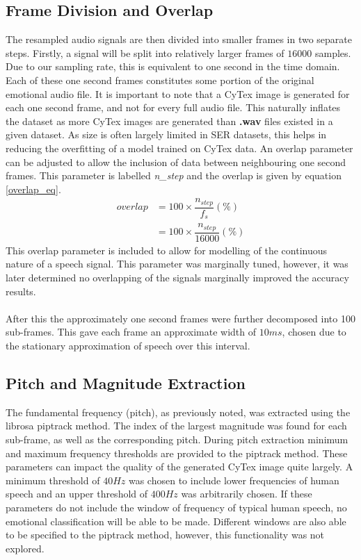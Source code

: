 \subsection{Frame Division and Overlap}
The resampled audio signals are then divided into smaller frames in two separate steps. Firstly, a signal will be split into relatively larger frames of $16000$ samples. Due to our sampling rate, this is equivalent to one second in the time domain. Each of these one second frames constitutes some portion of the original emotional audio file. It is important to note that a CyTex image is generated for each one second frame, and not for every full audio file. This naturally inflates the dataset as more CyTex images are generated than \textbf{.wav} files existed in a given dataset. As size is often largely limited in SER datasets, this helps in reducing the overfitting of a model trained on CyTex data. An overlap parameter can be adjusted to allow the inclusion of data between neighbouring one second frames. This parameter is labelled \textit{n\_step} and the overlap is given by equation \ref{overlap_eq}.
\begin{align} \label{overlap_eq}
    overlap &= 100 \times \dfrac{n_{step}}{f_s} (\%) \\
            &= 100 \times \dfrac{n_{step}}{16000} (\%) \nonumber
\end{align}
This overlap parameter is included to allow for modelling of the continuous nature of a speech signal. This parameter was marginally tuned, however, it was later determined no overlapping of the signals marginally improved the accuracy results.\\ \\
After this the approximately one second frames were further decomposed into 100 sub-frames. This gave each frame an approximate width of $10ms$, chosen due to the stationary approximation of speech over this interval.

\subsection{Pitch and Magnitude Extraction}
The fundamental frequency (pitch), as previously noted, was extracted using the librosa piptrack method. The index of the largest magnitude was found for each sub-frame, as well as the corresponding pitch. During pitch extraction minimum and maximum frequency thresholds are provided to the piptrack method. These parameters can impact the quality of the generated CyTex image quite largely. A minimum threshold of $40Hz$ was chosen to include lower frequencies of human speech and an upper threshold of $400Hz$ was arbitrarily chosen. If these parameters do not include the window of frequency of typical human speech, no emotional classification will be able to be made. Different windows are also able to be specified to the piptrack method, however, this functionality was not explored.

